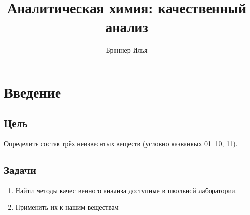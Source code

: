 \documentclass[a4paper,14pt,notitlepage,twoside]{article}
\title{Аналитическая химия: качественный анализ}
\author{Броннер Илья}
\begin{document}
    \section{Введение}
        \subsection{Цель}
            Определить состав трёх неизвеснтых веществ (условно названных 01, 10, 11).

        \subsection{Задачи}
            \begin{enumerate}
                \item
                    Найти методы качественного анализа доступные в школьной лаборатории.
                \item 
                    Применить их к нашим веществам
            \end{enumerate}
\end{document}

